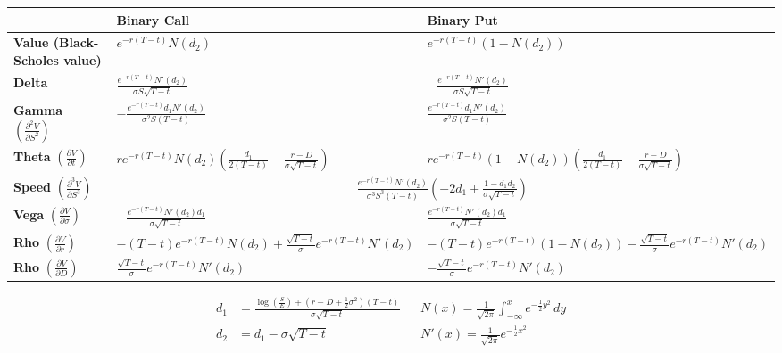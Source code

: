 \begin{center}
    \begin{tabularx}{\textwidth}{|X|X|X|}
        \hline
        & \textbf{Binary Call} & \textbf{Binary Put} \\
        \hline
        \textbf{Value (Black-Scholes value)} & $ e^{-r(T-t)} N(d_2) $ & $ e^{-r(T-t)} (1 - N(d_2)) $ \\
        \hline
        \textbf{Delta } & $ \frac{e^{-r(T-t)} N'(d_2)}{\sigma S \sqrt{T - t}} $ & $ -\frac{e^{-r(T-t)} N'(d_2)}{\sigma S \sqrt{T - t}} $ \\
        \hline
        \textbf{Gamma } $\left( \frac{\partial^2 V}{\partial S^2} \right)$ & $ -\frac{e^{-r(T-t)} d_1 N'(d_2)}{\sigma^2 S (T - t)} $ & $ \frac{e^{-r(T-t)} d_1 N'(d_2)}{\sigma^2 S (T - t)} $ \\
        \hline
        \textbf{Theta } $\left( \frac{\partial V}{\partial t} \right)$ & $ r e^{-r(T-t)} N(d_2) \left( \frac{d_1}{2 (T - t)} - \frac{r - D}{\sigma \sqrt{T - t}} \right) $ & $ r e^{-r(T-t)} (1 - N(d_2)) \left( \frac{d_1}{2 (T - t)} - \frac{r - D}{\sigma \sqrt{T - t}} \right) $ \\
        \hline
        \textbf{Speed } $\left( \frac{\partial^3 V}{\partial S^3} \right)$ & \multicolumn{2}{c|}{$ \frac{e^{-r(T-t)} N'(d_2)}{\sigma^3 S^3 (T - t)} \left( -2 d_1 + \frac{1 - d_1 d_2}{\sigma \sqrt{T - t}} \right) $} \\
        \hline
        \textbf{Vega } $\left( \frac{\partial V}{\partial \sigma} \right)$ & $ -\frac{e^{-r(T-t)} N'(d_2) d_1}{\sigma \sqrt{T - t}} $ & $ \frac{e^{-r(T-t)} N'(d_2) d_1}{\sigma \sqrt{T - t}} $ \\
        \hline
        \textbf{Rho } $\left( \frac{\partial V}{\partial r} \right)$ & $ -(T - t) e^{-r(T-t)} N(d_2) + \frac{\sqrt{T-t}}{\sigma}e^{-r(T-t)} N'(d_2) $ & $ -(T - t) e^{-r(T-t)} (1 - N(d_2)) - \frac{\sqrt{T-t}}{\sigma}e^{-r(T-t)} N'(d_2) $ \\
        \hline
        \textbf{Rho } $\left( \frac{\partial V}{\partial D} \right)$ & $ \frac{\sqrt{T - t}}{\sigma} e^{-r(T-t)} N'(d_2) $ & $ -\frac{\sqrt{T - t}}{\sigma} e^{-r(T-t)} N'(d_2) $ \\
        \hline
    \end{tabularx}
\end{center}
\begin{align*}
    d_1 &= \frac{\log \left( \frac{S}{E} \right) + \left( r - D + \frac{1}{2} \sigma^2 \right) (T - t)}{\sigma \sqrt{T - t}} && N(x) = \frac{1}{\sqrt{2 \pi}} \int_{-\infty}^x e^{- \frac{1}{2} y^2} \, dy \\
    d_2 &= d_1 - \sigma \sqrt{T - t} &&  N'(x) = \frac{1}{\sqrt{2 \pi}} e^{- \frac{1}{2} x^2}
\end{align*}




